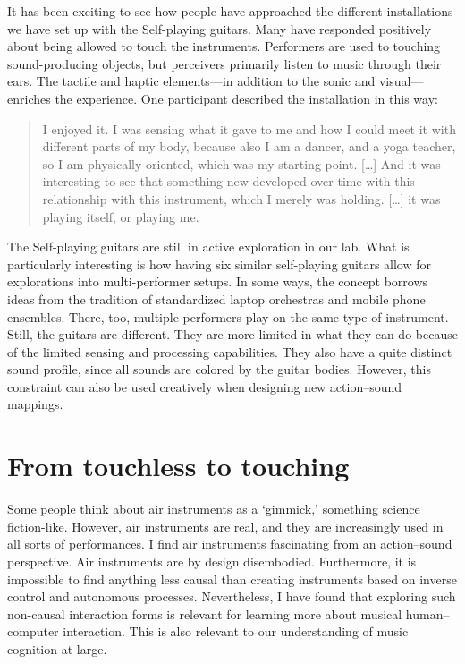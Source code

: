 It has been exciting to see how people have approached the different installations we have set up with the Self-playing guitars. Many have responded positively about being allowed to touch the instruments. Performers are used to touching sound-producing objects, but perceivers primarily listen to music through their ears. The tactile and haptic elements---in addition to the sonic and visual---enriches the experience. One participant described the installation in this way:

\begin{quote}
I enjoyed it. I was sensing what it gave to me and how I could meet it with different parts of my body, because also I am a dancer, and a yoga teacher, so I am physically oriented, which was my starting point. [\ldots] And it was interesting to see that something new developed over time with this relationship with this instrument, which I merely was holding. [\ldots] it was playing itself, or playing me.
\end{quote}

The Self-playing guitars are still in active exploration in our lab. What is particularly interesting is how having six similar self-playing guitars allow for explorations into multi-performer setups. In some ways, the concept borrows ideas from the tradition of standardized laptop orchestras and mobile phone ensembles. There, too, multiple performers play on the same type of instrument. Still, the guitars are different. They are more limited in what they can do because of the limited sensing and processing capabilities. They also have a quite distinct sound profile, since all sounds are colored by the guitar bodies. However, this constraint can also be used creatively when designing new action--sound mappings.


\section{From touchless to touching}

Some people think about air instruments as a `gimmick,' something science fiction-like. However, air instruments are real, and they are increasingly used in all sorts of performances. I find air instruments fascinating from an action--sound perspective. Air instruments are by design disembodied. Furthermore, it is impossible to find anything less causal than creating instruments based on inverse control and autonomous processes. Nevertheless, I have found that exploring such non-causal interaction forms is relevant for learning more about musical human--computer interaction. This is also relevant to our understanding of music cognition at large.

